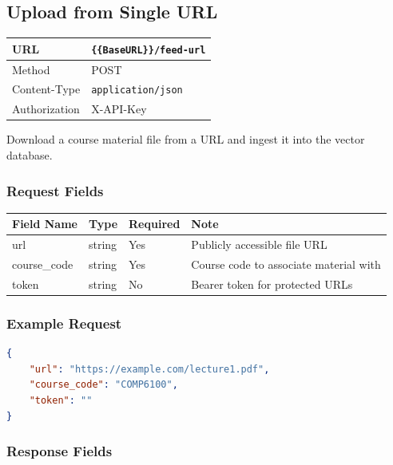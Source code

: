 \documentclass[11pt]{article}
\begin{document}
\subsection{Upload from Single URL}

\begin{tabular}{|H{3cm}|p{12.1cm}|}
  \hline
  URL           & \texttt{\{\{BaseURL\}\}/feed-url} \\
  \hline
  Method        & POST \\
  \hline
  Content-Type  & \texttt{application/json} \\
  \hline
  Authorization & X-API-Key \\
  \hline
\end{tabular}

Download a course material file from a URL and ingest it into the vector
database.

\subsubsection{Request Fields}

\begin{longtable}{|p{3.5cm}|p{2cm}|p{2cm}|p{6.8cm}|}
  \hline
  \rowcolor{tabheader}
  \textbf{Field Name} & \textbf{Type} & \textbf{Required} & \textbf{Note} \\
  \hline
  \endhead
  url          & string & Yes & Publicly accessible file URL \\
  \hline
  course\_code & string & Yes & Course code to associate material with \\
  \hline
  token        & string & No  & Bearer token for protected URLs \\
  \hline
\end{longtable}

\subsubsection{Example Request}

\begin{lstlisting}[language=json]
{
    "url": "https://example.com/lecture1.pdf",
    "course_code": "COMP6100",
    "token": ""
}
\end{lstlisting}

\subsubsection{Response Fields}
\end{document}
